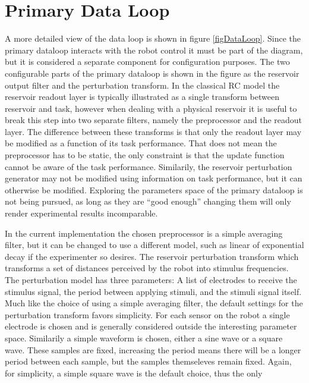 \section{Primary Data Loop}
A more detailed view of the data loop is shown in figure \ref{figDataLoop}.
Since the primary dataloop interacts with the robot control it must be part of
the diagram, but it is considered a separate component for configuration
purposes.
The two configurable parts of the primary dataloop is shown in the figure as the
reservoir output filter and the perturbation transform.
In the classical RC model the reservoir readout layer is typically illustrated as
a single transform between reservoir and task, however when dealing with a
physical reservoir it is useful to break this step into two separate filters,
namely the preprocessor and the readout layer.
The difference between these transforms is that only the readout layer may be
modified as a function of its task performance.
That does not mean the preprocessor has to be static, the only constraint is
that the update function cannot be aware of the task performance.
Similarily, the reservoir perturbation generator may not be modified using
information on task performance, but it can otherwise be modified.
Exploring the parameters space of the primary dataloop is not being pursued, as
long as they are ``good enough'' changing them will only render experimental
results incomparable.
\par
In the current implementation the chosen preprocessor is a simple averaging
filter, but it can be changed to use a different model, such as linear of
exponential decay if the experimenter so desires.
The reservoir perturbation transform which transforms a
set of distances perceived by the robot into stimulus frequencies.
The perturbation model has three parameters: A list of electrodes to receive the
stimulus signal, the period between applying stimuli, and the stimuli signal
itself.
Much like the choice of using a simple averaging filter, the default settings
for the perturbation transform favors simplicity.
For each sensor on the robot a single electrode is chosen and is generally
considered outside the interesting parameter space.
Similarily a simple waveform is chosen, either a sine wave or a square wave.
These samples are fixed, increasing the period means there will be a longer
period between each sample, but the samples themseleves remain fixed.
Again, for simplicity, a simple square wave is the default choice, thus the only
